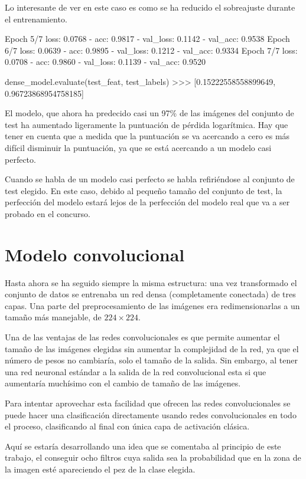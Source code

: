 Lo interesante de ver en este caso es como se ha reducido el sobreajuste durante el entrenamiento.

\begin{python}
Epoch 5/7
loss: 0.0768 - acc: 0.9817 - val_loss: 0.1142 - val_acc: 0.9538
Epoch 6/7
loss: 0.0639 - acc: 0.9895 - val_loss: 0.1212 - val_acc: 0.9334
Epoch 7/7
loss: 0.0708 - acc: 0.9860 - val_loss: 0.1139 - val_acc: 0.9520

dense_model.evaluate(test_feat, test_labels)
>>> [0.15222558558899649, 0.96723868954758185]
\end{python}

El modelo, que ahora ha predecido casi un 97\% de las imágenes del conjunto de test ha aumentado ligeramente la puntuación de pérdida logarítmica. Hay que tener en cuenta que a medida que la puntuación se va acercando a cero es más difícil disminuir la puntuación, ya que se está acercando a un modelo casi perfecto. 

Cuando se habla de un modelo casi perfecto se habla refiriéndose al conjunto de test elegido. En este caso, debido al pequeño tamaño del conjunto de test, la perfección del modelo estará lejos de la perfección del modelo real que va a ser probado en el concurso.


\section{Modelo convolucional}

Hasta ahora se ha seguido siempre la misma estructura: una vez transformado el conjunto de datos se entrenaba un red densa (completamente conectada) de tres capas. Una parte del preprocesamiento de las imágenes era redimensionarlas a un tamaño más manejable, de $224\times224$.

Una de las ventajas de las redes convolucionales es que permite aumentar el tamaño de las imágenes elegidas sin aumentar la complejidad de la red, ya que el número de pesos no cambiaría, solo el tamaño de la salida. Sin embargo, al tener una red neuronal estándar a la salida de la red convolucional esta si que aumentaría muchísimo con el cambio de tamaño de las imágenes.

Para intentar aprovechar esta facilidad que ofrecen las redes convolucionales se puede hacer una clasificación directamente usando redes convolucionales en todo el proceso, clasificando al final con única capa de activación clásica.

Aquí se estaría desarrollando una idea que se comentaba al principio de este trabajo, el conseguir ocho filtros cuya salida sea la probabilidad que en la zona de la imagen esté apareciendo el pez de la clase elegida.

